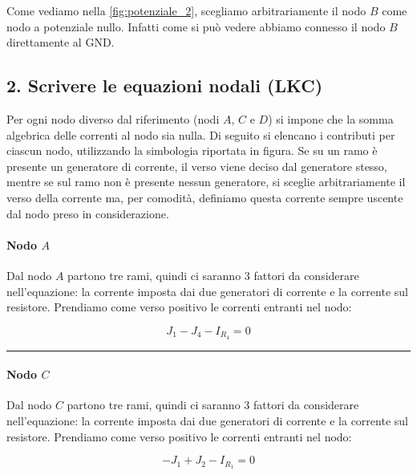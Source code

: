 Come vediamo nella \ref{fig:potenziale_2}, scegliamo arbitrariamente il nodo $B$ come nodo a potenziale nullo. Infatti come si può vedere abbiamo connesso il nodo $B$ direttamente al GND.


\subsection*{2. Scrivere le equazioni nodali (LKC)}

Per ogni nodo diverso dal riferimento (nodi $A$, $C$ e $D$) si impone che la somma algebrica delle correnti al nodo sia nulla. Di seguito si elencano i contributi per ciascun nodo, utilizzando la simbologia riportata in figura. Se su un ramo è presente un generatore di corrente, il verso viene deciso dal generatore stesso, mentre se sul ramo non è presente nessun generatore, si sceglie arbitrariamente il verso della corrente ma, per comodità, definiamo questa corrente sempre uscente dal nodo preso in considerazione.

\paragraph{Nodo $A$}
\begin{minipage}[t]{0.6\textwidth}
\vspace{0pt}
Dal nodo $A$ partono tre rami, quindi ci saranno 3 fattori da considerare nell'equazione: la corrente imposta dai due generatori di corrente e la corrente sul resistore. Prendiamo come verso positivo le correnti entranti nel nodo:

\begin{equation}
J_1 - J_4 - I_{R_4} = 0
\label{eq:nodoA}
\end{equation}
\end{minipage}
\hfill
\begin{minipage}[t]{0.3\textwidth}
\vspace{0pt}
\centering
{}
\end{minipage}

\vspace{0.5cm}
\hrule
\vspace{0.5cm}

\paragraph{Nodo $C$}
\begin{minipage}[t]{0.6\textwidth}
\vspace{0pt}
Dal nodo $C$ partono tre rami, quindi ci saranno 3 fattori da considerare nell'equazione: la corrente imposta dai due generatori di corrente e la corrente sul resistore. Prendiamo come verso positivo le correnti entranti nel nodo:

\begin{equation}
- J_1 + J_2 - I_{R_1} = 0
\label{eq:nodoC}
\end{equation}
\end{minipage}
\hfill
\begin{minipage}[t]{0.3\textwidth}
\vspace{0pt}
\centering
{}
\end{minipage}

